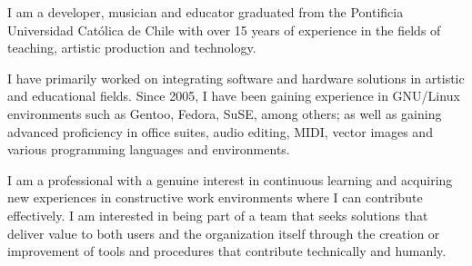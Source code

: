 

\begin{cvparagraph}

I am a developer, musician and educator graduated from the Pontificia
Universidad Católica de Chile with over 15 years of experience in the fields of
teaching, artistic production and technology.

I have primarily worked on integrating software and hardware solutions in
artistic and educational fields. Since 2005, I have been gaining experience in
GNU/Linux environments such as Gentoo, Fedora, SuSE, among others; as
well as gaining advanced proficiency in office suites, audio editing,
MIDI, vector images and various programming languages and environments.

I am a professional with a genuine interest in continuous learning and
acquiring new experiences in constructive work environments where I can
contribute effectively. I am interested in being part of a team that seeks
solutions that deliver value to both users and the organization itself
through the creation or improvement of tools and procedures that contribute
technically and humanly.

\end{cvparagraph}

